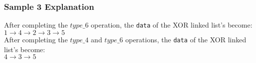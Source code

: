 \subsubsection{Sample 3 Explanation}\label{sample-3-explanation}

After completing the $type\_6$ operation, the \texttt{data} of the XOR linked list's become: \\
$1\rightarrow 4\rightarrow 2\rightarrow 3\rightarrow 5$ \\
After completing the $type\_4$ and $type\_6$ operations, the \texttt{data} of the XOR linked list's become: \\
$4\rightarrow 3\rightarrow 5$